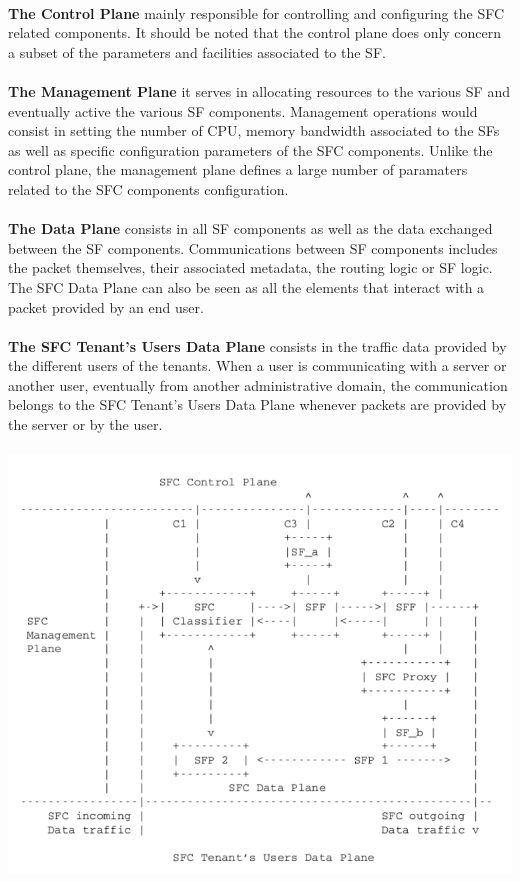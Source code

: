 \\
\textbf{The Control Plane} mainly responsible for controlling and configuring the SFC related components. It should be noted that the control plane does only concern a subset of the parameters and facilities associated to the SF.\\
\\
\textbf{The Management Plane} it serves in allocating resources to the various SF and eventually active the various SF components. Management operations would consist in setting the number of CPU, memory bandwidth associated to the SFs as well as specific configuration parameters of the SFC components. Unlike the control plane, the management plane defines a large number of paramaters related to the SFC components configuration.\\
\\
\textbf{The Data Plane} consists in all SF components as well as the data exchanged between the SF components. Communications between SF components includes the packet themselves, their associated metadata, the routing logic or SF
logic. The SFC Data Plane can also be seen as all the elements that interact with a packet provided by an end user.\\
\\
\textbf{The SFC Tenant’s Users Data Plane} consists in the traffic data provided by the different users of the tenants. When a user is communicating with a server or another user, eventually from another administrative domain, the communication belongs to
the SFC Tenant’s Users Data Plane whenever packets are provided by the server or by the user.\\
\\
\includegraphics[scale=0.45]{sfc1}
